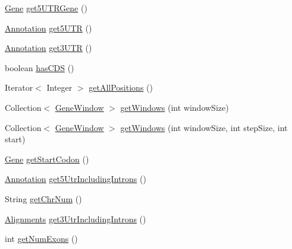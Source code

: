 \begin{DoxyCompactItemize}
\item 
\hyperlink{classumms_1_1core_1_1annotation_1_1_gene}{Gene} \hyperlink{classumms_1_1core_1_1annotation_1_1_gene_ab02249dcebe27ea4d2dc72a8632e27ce}{get5\+U\+T\+R\+Gene} ()
\item 
\hyperlink{interfaceumms_1_1core_1_1annotation_1_1_annotation}{Annotation} \hyperlink{classumms_1_1core_1_1annotation_1_1_gene_af8460b1e69cc22e216a0c59da1e9dc88}{get5\+U\+T\+R} ()
\item 
\hyperlink{interfaceumms_1_1core_1_1annotation_1_1_annotation}{Annotation} \hyperlink{classumms_1_1core_1_1annotation_1_1_gene_a5da62e5fc6fc17a00f28b91a2d692c3e}{get3\+U\+T\+R} ()
\item 
boolean \hyperlink{classumms_1_1core_1_1annotation_1_1_gene_a96383aae3bda0a1ba219abc83635d4bf}{has\+C\+D\+S} ()
\item 
Iterator$<$ Integer $>$ \hyperlink{classumms_1_1core_1_1annotation_1_1_gene_ae3bffcffd420d44f6c6dfe9add7f6278}{get\+All\+Positions} ()
\item 
Collection$<$ \hyperlink{classumms_1_1core_1_1feature_1_1_gene_window}{Gene\+Window} $>$ \hyperlink{classumms_1_1core_1_1annotation_1_1_gene_a7f356196d32e8ee61a6bf203c722827d}{get\+Windows} (int window\+Size)
\item 
Collection$<$ \hyperlink{classumms_1_1core_1_1feature_1_1_gene_window}{Gene\+Window} $>$ \hyperlink{classumms_1_1core_1_1annotation_1_1_gene_a296bd8542ee7397933d6dc58117f2bc0}{get\+Windows} (int window\+Size, int step\+Size, int start)
\item 
\hyperlink{classumms_1_1core_1_1annotation_1_1_gene}{Gene} \hyperlink{classumms_1_1core_1_1annotation_1_1_gene_a66af3f09f9f1adfc842397613d1e5ff7}{get\+Start\+Codon} ()
\item 
\hyperlink{interfaceumms_1_1core_1_1annotation_1_1_annotation}{Annotation} \hyperlink{classumms_1_1core_1_1annotation_1_1_gene_aeacc46ef311ac493dc1c5f1d82190a8e}{get5\+Utr\+Including\+Introns} ()
\item 
String \hyperlink{classumms_1_1core_1_1annotation_1_1_gene_af827d888eaeea5171833f59e83832776}{get\+Chr\+Num} ()
\item 
\hyperlink{classbroad_1_1pda_1_1datastructures_1_1_alignments}{Alignments} \hyperlink{classumms_1_1core_1_1annotation_1_1_gene_aae0325e4bc1a847f48930fe1c62952bd}{get3\+Utr\+Including\+Introns} ()
\item 
int \hyperlink{classumms_1_1core_1_1annotation_1_1_gene_a1a7e633ec4a457829ae8f17223d5d58c}{get\+Num\+Exons} ()
\item 

\end{DoxyCompactItemize}
